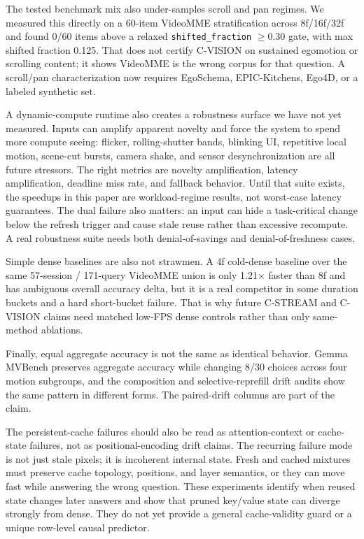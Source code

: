 The tested benchmark mix also under-samples scroll and pan regimes. We measured
this directly on a 60-item VideoMME stratification across 8f/16f/32f and found
0/60 items above a relaxed \texttt{shifted\_fraction} \(\geq 0.30\) gate, with
max shifted fraction 0.125. That does not certify C-VISION on sustained
egomotion or scrolling content; it shows VideoMME is the wrong corpus for that
question. A scroll/pan characterization now requires EgoSchema, EPIC-Kitchens,
Ego4D, or a labeled synthetic set.

A dynamic-compute runtime also creates a robustness surface we have not yet
measured. Inputs can amplify apparent novelty and force the system to spend
more compute seeing: flicker, rolling-shutter bands, blinking UI, repetitive
local motion, scene-cut bursts, camera shake, and sensor desynchronization are
all future stressors. The right metrics are novelty amplification, latency
amplification, deadline miss rate, and fallback behavior. Until that suite
exists, the speedups in this paper are workload-regime results, not worst-case
latency guarantees.
The dual failure also matters: an input can hide a task-critical change below
the refresh trigger and cause stale reuse rather than excessive recompute. A
real robustness suite needs both denial-of-savings and denial-of-freshness
cases.

Simple dense baselines are also not strawmen. A 4f cold-dense baseline over the
same 57-session / 171-query VideoMME union is only 1.21$\times$ faster than 8f
and has ambiguous overall accuracy delta, but it is a real competitor in some
duration buckets and a hard short-bucket failure. That is why future C-STREAM
and C-VISION claims need matched low-FPS dense controls rather than only
same-method ablations.

Finally, equal aggregate accuracy is not the same as identical behavior. Gemma
MVBench preserves aggregate accuracy while changing 8/30 choices across four
motion subgroups, and the composition and selective-reprefill drift audits show
the same pattern in different forms. The paired-drift columns are part of the
claim.

The persistent-cache failures should also be read as attention-context or
cache-state failures, not as positional-encoding drift claims. The recurring
failure mode is not just stale pixels; it is incoherent internal state. Fresh
and cached mixtures must preserve cache topology, positions, and layer
semantics, or they can move fast while answering the wrong question. These
experiments identify when reused state changes later answers and show that
pruned key/value state can diverge strongly from dense. They do not yet provide a
general cache-validity guard or a unique row-level causal predictor.

